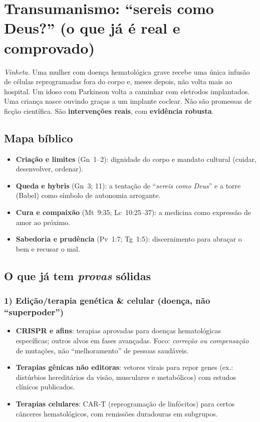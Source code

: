 \chapter{Transumanismo: ``sereis como Deus?'' (o que já é real e comprovado)}
\noindent\textit{Vinheta.} Uma mulher com doença hematológica grave recebe uma única infusão de células reprogramadas fora do corpo e, meses depois, não volta mais ao hospital. Um idoso com Parkinson volta a caminhar com eletrodos implantados. Uma criança nasce ouvindo graças a um implante coclear. Não são promessas de ficção científica. São \textbf{intervenções reais}, com \textbf{evidência robusta}.

\section{Mapa bíblico}
\begin{itemize}[leftmargin=*,noitemsep]
  \item \textbf{Criação e limites} (Gn~1--2): dignidade do corpo e mandato cultural (cuidar, desenvolver, ordenar).
  \item \textbf{Queda e hybris} (Gn~3; 11): a tentação de ``\emph{sereis como Deus}'' e a torre (Babel) como símbolo de autonomia arrogante.
  \item \textbf{Cura e compaixão} (Mt~9:35; Lc~10:25--37): a medicina como expressão de amor ao próximo.
  \item \textbf{Sabedoria e prudência} (Pv~1:7; Tg~1:5): discernimento para abraçar o bem e recusar o mal.
\end{itemize}

\section{O que já tem \emph{provas} sólidas}
\subsection*{1) Edição/terapia genética \& celular (doença, não ``superpoder'')}
\begin{itemize}[leftmargin=*,noitemsep]
  \item \textbf{CRISPR e afins}: terapias aprovadas para doenças hematológicas específicas; outros alvos em fases avançadas. Foco: \emph{correção ou compensação} de mutações, não ``melhoramento'' de pessoas saudáveis.
  \item \textbf{Terapias gênicas não editoras}: vetores virais para repor genes (ex.: distúrbios hereditários da visão, musculares e metabólicos) com estudos clínicos publicados.
  \item \textbf{Terapias celulares}: CAR-T (reprogramação de linfócitos) para certos cânceres hematológicos, com remissões duradouras em subgrupos.
\end{itemize}

